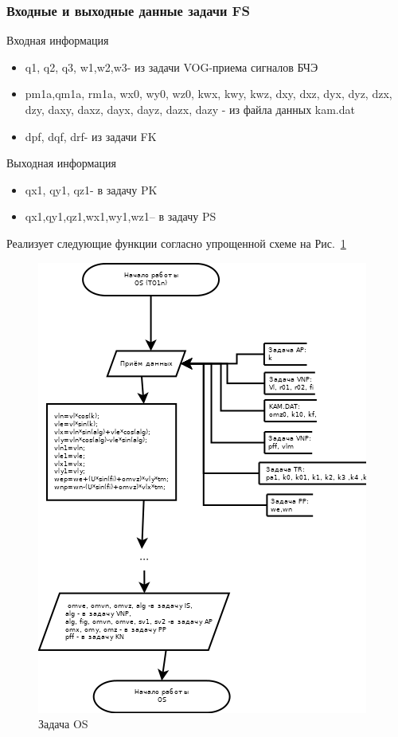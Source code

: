 \subsubsection{Входные и выходные данные задачи FS}
Входная информация
\begin{itemize}
    \item q1, q2, q3, w1,w2,w3- из задачи  VOG-приема сигналов БЧЭ
    \item pm1a,qm1a, rm1a, wx0, wy0, wz0, kwx, kwy, kwz, dxy, dxz, dyx, dyz, dzx, dzy, daxy, daxz, dayx, dayz, dazx, dazy - из файла данных kam.dat
    \item dpf, dqf, drf- из задачи  FK
\end{itemize}
Выходная информация
\begin{itemize}
    \item qx1, qy1, qz1- в задачу PK
    \item qx1,qy1,qz1,wx1,wy1,wz1-- в задачу PS
\end{itemize}
Реализует следующие функции согласно упрощенной схеме на Рис.~\ref{fig:OS}
\begin{figure}[H]
    \centering
    \includegraphics[width=0.8\linewidth]{images/OS_simple.png}
    \caption{Задача OS}
    \label{fig:OS}
\end{figure}
